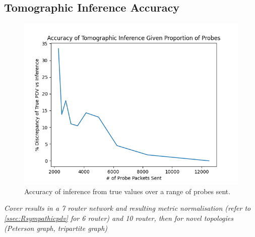 \subsection*{Tomographic Inference Accuracy}
\begin{figure}[H]
        \centering
        \includegraphics[width=\textwidth]{figs/results/Probe_PDV_accuracy_plot.png}
        \caption{Accuracy of inference from true values over a range of probes sent.}
        \label{fig:Rqstabilization}
\end{figure}
\emph{Cover results in a 7 router network and resulting metric normalisation (refer to \cref{ssec:Rsympathicpdv} for 6 router) and 10 router, then for novel topologies (Peterson graph, tripartite graph)}


